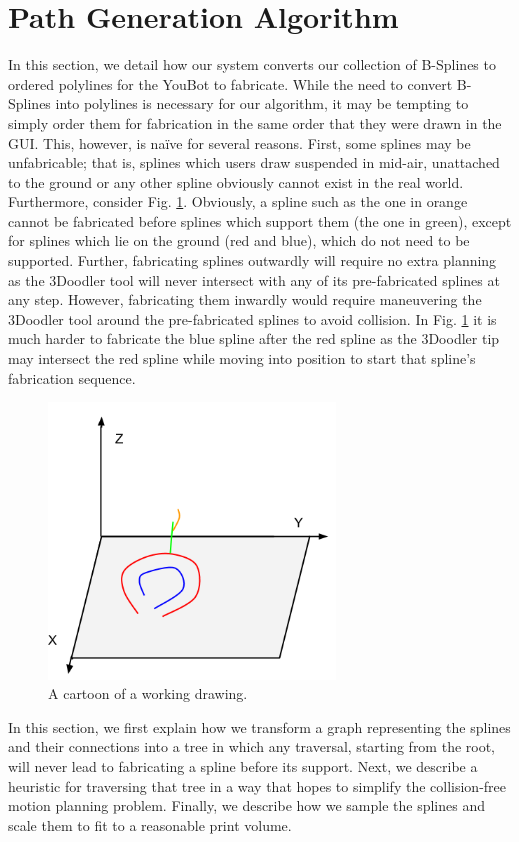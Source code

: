 \documentclass[conference]{acmsiggraph}
\begin{document}
\section{Path Generation Algorithm}
In this section, we detail how our system converts our collection of B-Splines to ordered polylines for the YouBot to fabricate.  While the need to convert B-Splines into polylines is necessary for our algorithm, it may be tempting to simply order them for fabrication in the same order that they were drawn in the GUI.  This, however, is na{\"i}ve for several reasons.  First, some splines may be unfabricable; that is, splines which users draw suspended in mid-air, unattached to the ground or any other spline obviously cannot exist in the real world.  Furthermore, consider Fig. \ref{fig:splines}.  Obviously, a spline such as the one in orange cannot be fabricated before splines which support them (the one in green), except for splines which lie on the ground (red and blue), which do not need to be supported.  Further, fabricating splines outwardly will require no extra planning as the 3Doodler tool will never intersect with any of its pre-fabricated splines at any step.  However, fabricating them inwardly would require maneuvering the 3Doodler tool around the pre-fabricated splines to avoid collision.  In Fig. \ref{fig:splines} it is much harder to fabricate the blue spline after the red spline as the 3Doodler tip may intersect the red spline while moving into position to start that spline's fabrication sequence.

\begin{figure}[t]
\centering
\includegraphics[width=3.0in]{images/Splines.png}
\caption{A cartoon of a working drawing.}
\label{fig:splines}
\end{figure}

In this section, we first explain how we transform a graph representing the splines and their connections into a tree in which any traversal, starting from the root, will never lead to fabricating a spline before its support.  Next, we describe a heuristic for traversing that tree in a way that hopes to simplify the collision-free motion planning problem.  Finally, we describe how we sample the splines and scale them to fit to a reasonable print volume.
\end{document}
